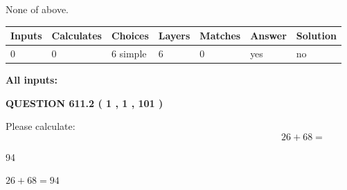 \documentclass[12pt]{article}
\begin{document}
 
\noindent{}
 
 
 None of above.
 
 
\noindent{}
 
 
   
   
   
   
\noindent\begin{tabular}{|l|l|l|l|l|l|l|}
 \hline
Inputs & Calculates & Choices & Layers & Matches & Answer & Solution \\ \hline
 0  & 
 0  & 
 6
  simple  
  & 
 6  & 
 0  & 
  yes & 
  no 
  \\ \hline
 \end{tabular}
   
   
   
   
\noindent{}
   
   
   
   
\noindent\vspace{0.1in}\hspace{-0.08in} {\textbf{\Large{All inputs: }}}
   
   
  
\vspace{0.2in}
  
{\textbf{\Large{QUESTION
611.2 
 ( 1 , 1 , 101 )
}}}
  
  
 
Please calculate:
\begin{equation}
26 +  %
68 = \nonumber
\end{equation}
 
 
 
\noindent{}
 
 

94
 
 
\noindent{}
 
 

 
 
 
\noindent{}
 
 

$ %
26 +  %
68=   %
94$
 
\end{document}
